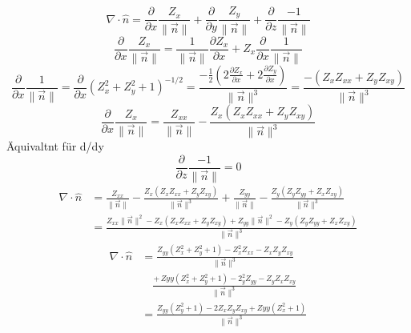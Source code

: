 \begin{refsection}
\begin{equation}
\nabla \cdot \hat{n} = \frac{\partial}{\partial x} \frac{Z_x}{\|\vec{n}\|} + \frac{\partial}{\partial y} \frac{Z_y}{\|\vec{n}\|} + \frac{\partial}{\partial z}\frac{-1}{\|\vec{n}\|}
\end{equation}
\begin{equation}
\frac{\partial}{\partial x} \frac{Z_x}{\|\vec{n}\|} = \frac{1}{\|\vec{n}\|} \frac{\partial Z_x}{\partial x} + Z_x \frac{\partial}{\partial x} \frac{1}{\|\vec{n}\|}
\end{equation}
\begin{equation}
\frac{\partial}{\partial x} \frac{1}{\|\vec{n}\|} = \frac{\partial}{\partial x} (Z_x^2+Z_y^2+1)^{-1/2} = \frac{-\frac{1}{2} (2\frac{\partial Z_x}{\partial x} + 2\frac{\partial Z_y}{\partial x})}{\|\vec{n}\|^3} =\frac{-(Z_x Z_{xx}+Z_y Z_{xy})}{\|\vec{n}\|^3}
\end{equation}
\begin{equation}
\frac{\partial}{\partial x} \frac{Z_x}{\|\vec{n}\|} = \frac{Z_{xx}}{\|\vec{n}\|}-\frac{Z_x(Z_x Z_{xx} + Z_y Z_{xy})}{\|\vec{n}\|^3}
\end{equation}
Äquivaltnt für d/dy
\begin{equation}
\frac{\partial}{\partial z}\frac{-1}{\|\vec{n}\|}=0
\end{equation}
\begin{equation}
\begin{split}
\nabla \cdot \hat{n} &= \frac{Z_{xx}}{\|\vec{n}\|}-\frac{Z_x(Z_x Z_{xx} + Z_y Z_{xy})}{\|\vec{n}\|^3} + \frac{Z_{yy}}{\|\vec{n}\|}-\frac{Z_y(Z_y Z_{yy} + Z_x Z_{xy})}{\|\vec{n}\|^3} \\
&=\frac{Z_{xx}\|\vec{n}\|^2 - Z_x(Z_x Z_{xx} + Z_y Z_{xy}) + Z_{yy}\|\vec{n}\|^2 - Z_y(Z_y Z_{yy} + Z_x Z_{xy})}{\|\vec{n}\|^3}
\end{split}
\end{equation}
\begin{equation}
\begin{split}
\nabla \cdot \hat{n} &= \frac{Z_{yy}(Z_x^2+Z_y^2+1)-Z_x^2Z_{xx} - Z_xZ_yZ_{xy}}{\|\vec{n}\|^3} \\
& \quad \frac{+ \, Zyy(Z_x^2+Z_y^2+1)-2_y^2Z_{yy}-Z_yZ_xZ_{xy}}{\|\vec{n}\|^3} \\
&= \frac{Z_{yy}(Z_y^2+1) - 2 Z_xZ_yZ_{xy}+Zyy(Z_x^2+1)}{\|\vec{n}\|^3}
\end{split}
\end{equation}
\fi


\printbibliography[heading=subbibliography]
\end{refsection}